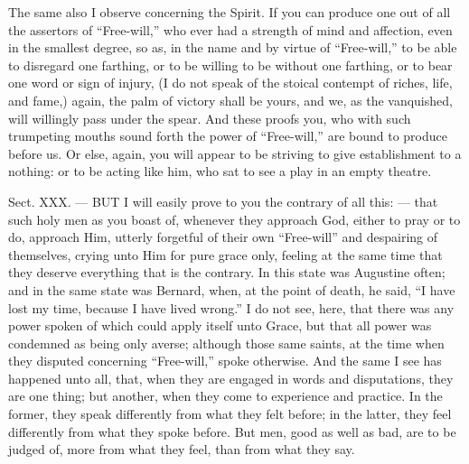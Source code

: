 The same also I observe concerning the Spirit. If you can produce one out of all the assertors of “Free-will,” who ever had a strength of mind and affection, even in the smallest degree, so as, in the name and by virtue of “Free-will,” to be able to disregard one farthing, or to be willing to be without one farthing, or to bear one word or sign of injury, (I do not speak of the stoical contempt of riches, life, and fame,) again, the palm of victory shall be yours, and we, as the vanquished, will willingly pass under the spear. And these proofs you, who with such trumpeting mouths sound forth the power of “Free-will,” are bound to produce before us. Or else, again, you will appear to be striving to give establishment to a nothing: or to be acting like him, who sat to see a play in an empty theatre.


Sect. XXX. — BUT I will easily prove to you the contrary of all this: — that such holy men as you boast of, whenever they approach God, either to pray or to do, approach Him, utterly forgetful of their own “Free-will” and despairing of themselves, crying unto Him for pure grace only, feeling at the same time that they deserve everything that is the contrary. In this state was Augustine often; and in the same state was Bernard, when, at the point of death, he said, “I have lost my time, because I have lived wrong.” I do not see, here, that there was any power spoken of which could apply itself unto Grace, but that all power was condemned as being only averse; although those same saints, at the time when they disputed concerning “Free-will,” spoke otherwise. And the same I see has happened unto all, that, when they are engaged in words and disputations, they are one thing; but another, when they come to experience and practice. In the former, they speak differently from what they felt before; in the latter, they feel differently from what they spoke before. But men, good as well as bad, are to be judged of, more from what they feel, than from what they say.

